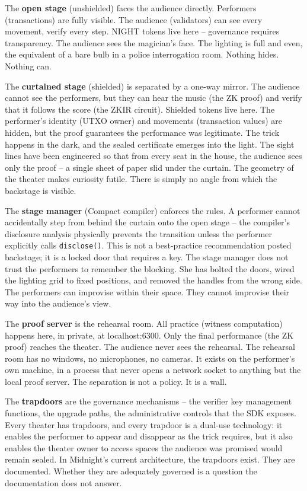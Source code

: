 \documentclass[
  11pt,
  openany]{report}
\renewcommand{\textbf}[1]{{\bfseries\color{MidnightBold}#1}}
\begin{document}
The \textbf{open stage} (unshielded) faces the audience directly. Performers
(transactions) are fully visible. The audience (validators) can see every
movement, verify every step. NIGHT tokens live here -- governance requires
transparency. The audience sees the magician's face. The lighting is full and
even, the equivalent of a bare bulb in a police interrogation room. Nothing
hides. Nothing can.

The \textbf{curtained stage} (shielded) is separated by a one-way mirror. The
audience cannot see the performers, but they can hear the music (the ZK proof)
and verify that it follows the score (the ZKIR circuit). Shielded tokens live
here. The performer's identity (UTXO owner) and movements (transaction values)
are hidden, but the proof guarantees the performance was legitimate. The trick
happens in the dark, and the sealed certificate emerges into the light. The
sight lines have been engineered so that from every seat in the house, the
audience sees only the proof -- a single sheet of paper slid under the curtain.
The geometry of the theater makes curiosity futile. There is simply no angle
from which the backstage is visible.

The \textbf{stage manager} (Compact compiler) enforces the rules. A performer
cannot accidentally step from behind the curtain onto the open stage -- the
compiler's disclosure analysis physically prevents the transition unless the
performer explicitly calls \texttt{disclose()}. This is not a best-practice
recommendation posted backstage; it is a locked door that requires a key. The
stage manager does not trust the performers to remember the blocking. She has
bolted the doors, wired the lighting grid to fixed positions, and removed the
handles from the wrong side. The performers can improvise within their space.
They cannot improvise their way into the audience's view.

The \textbf{proof server} is the rehearsal room. All practice (witness
computation) happens here, in private, at localhost:6300. Only the final
performance (the ZK proof) reaches the theater. The audience never sees the
rehearsal. The rehearsal room has no windows, no microphones, no cameras. It
exists on the performer's own machine, in a process that never opens a network
socket to anything but the local proof server. The separation is not a policy.
It is a wall.

The \textbf{trapdoors} are the governance mechanisms -- the verifier key
management functions, the upgrade paths, the administrative controls that the
SDK exposes. Every theater has trapdoors, and every trapdoor is a dual-use
technology: it enables the performer to appear and disappear as the trick
requires, but it also enables the theater owner to access spaces the audience
was promised would remain sealed. In Midnight's current architecture, the
trapdoors exist. They are documented. Whether they are adequately governed is a
question the documentation does not answer.
\end{document}

